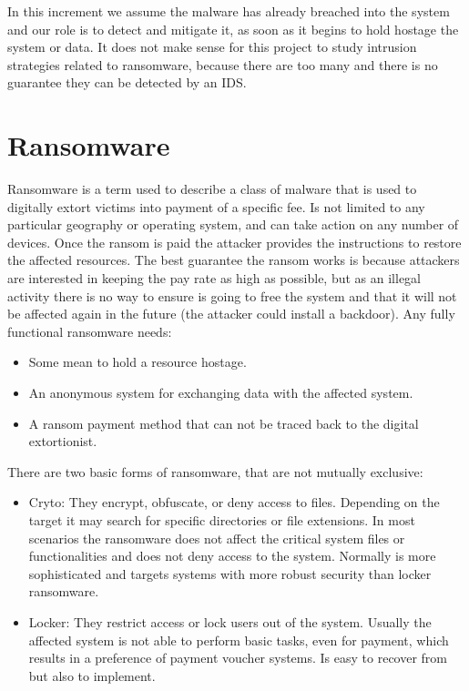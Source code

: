In this increment we assume the malware has already breached into the system and our role is to detect and mitigate it, as soon as it begins to hold hostage the system or data.
It does not make sense for this project to study intrusion strategies related to ransomware, because there are too many and there is no guarantee they can be detected by an IDS.

\section{Ransomware}
Ransomware is a term used to describe a class of malware that is used to digitally extort victims into payment of a specific fee.
Is not limited to any particular geography or operating system, and can take action on any number of devices\cite{ransomware_oReilly}.
\linej
Once the ransom is paid the attacker provides the instructions to restore the affected resources.
The best guarantee the ransom works is because attackers are interested in keeping the pay rate as high as possible, but as an illegal activity there is no way to ensure is going to free the system and that it will not be affected again in the future (the attacker could install a backdoor).
\linej
\linej
Any fully functional ransomware needs\cite{ransomware_digital_extortion}:
\begin{itemize}
\item Some mean to hold a resource hostage.
\item An anonymous system for exchanging data with the affected system.
\item A ransom payment method that can not be traced back to the digital extortionist.
\end{itemize}
\linej
There are two basic forms of ransomware, that are not mutually exclusive\cite{ransomware_digital_extortion}\cite{ransomware_oReilly}:
\begin{itemize}
\item Cryto: They encrypt, obfuscate, or deny access to files.
Depending on the target it may search for specific directories or file extensions.
In most scenarios the ransomware does not affect the critical system files or functionalities and does not deny access to the system.
Normally is more sophisticated and targets systems with more robust security than locker ransomware.
\item Locker: They restrict access or lock users out of the system.
Usually the affected system is not able to perform basic tasks, even for payment, which results in a preference of payment voucher systems.
Is easy to recover from but also to implement.
\end{itemize}
